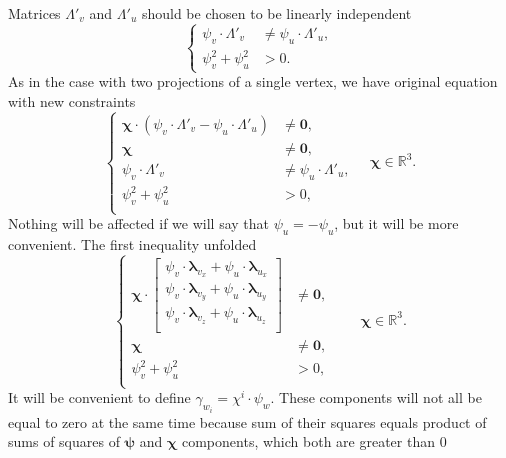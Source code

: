 Matrices $\Lambda'_v$ and $\Lambda'_u$
should be chosen to be linearly independent
\begin{equation*}
  \left\{\begin{aligned}
    \psi_v \cdot \Lambda'_v &\neq \psi_u \cdot \Lambda'_u, \\
    \psi_v^2 + \psi_u^2 &> 0.
  \end{aligned}\right.
\end{equation*}
As in the case with two projections of a single vertex,
we have original equation with new constraints
\begin{equation*}
  \left\{\begin{aligned}
    \pmb{\chi} \cdot \left( \psi_v \cdot \Lambda'_v
                - \psi_u \cdot \Lambda'_u \right)
    &\neq \pmb{0}, \\
    \pmb{\chi} &\neq \pmb{0}, \\
    \psi_v \cdot \Lambda'_v &\neq \psi_u \cdot \Lambda'_u, \\
    \psi_v^2 + \psi_u^2 &> 0, \\
  \end{aligned}\right.
  \quad \pmb{\chi} \in \mathbb{R}^3.
\end{equation*}
Nothing will be affected if we will say that $\psi_u = - \psi_u$,
but it will be more convenient.
The first inequality unfolded
\begin{equation*}
  \left\{\begin{aligned}
    \pmb{\chi} \cdot \begin{bmatrix}
      \psi_v \cdot \pmb{\lambda}_{v_x} + \psi_u \cdot \pmb{\lambda}_{u_x} \\
      \psi_v \cdot \pmb{\lambda}_{v_y} + \psi_u \cdot \pmb{\lambda}_{u_y} \\
      \psi_v \cdot \pmb{\lambda}_{v_z} + \psi_u \cdot \pmb{\lambda}_{u_z} \\
    \end{bmatrix}
    &\neq \pmb{0}, \\
    \pmb{\chi} &\neq \pmb{0}, \\
    \psi_v^2 + \psi_u^2 &> 0, \\
  \end{aligned}\right.
  \qquad \pmb{\chi} \in \mathbb{R}^3.
\end{equation*}
It will be convenient to define $\gamma_{w_i} = \chi^i \cdot \psi_w$.
These components will not all be equal to zero at the same time because
sum of their squares equals product of sums of squares
of $\pmb{\psi}$ and $\pmb{\chi}$ components, which both are greater than $0$
